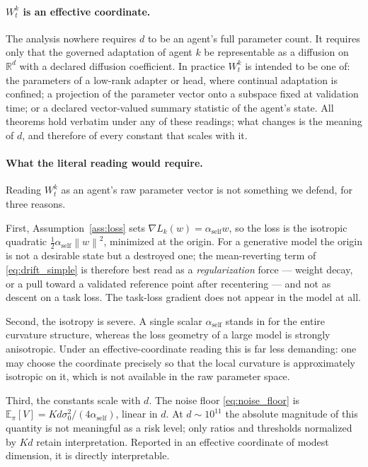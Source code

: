 \documentclass[12pt]{article}
\theoremstyle{plain}
\theoremstyle{definition}
\newcommand{\R}{\mathbb{R}}
\newcommand{\E}{\mathbb{E}}
\newcommand{\norm}[1]{\left\lVert #1 \right\rVert}
\newcommand{\loss}{L}
\begin{document}
\paragraph{$W^k_t$ is an effective coordinate.}
The analysis nowhere requires $d$ to be an agent's full parameter count. It requires only that the
governed adaptation of agent $k$ be representable as a diffusion on $\R^d$ with a declared
diffusion coefficient. In practice $W^k_t$ is intended to be one of: the parameters of a low-rank
adapter or head, where continual adaptation is confined; a projection of the parameter vector onto
a subspace fixed at validation time; or a declared vector-valued summary statistic of the agent's
state. All theorems hold verbatim under any of these readings; what changes is the meaning of $d$,
and therefore of every constant that scales with it.

\paragraph{What the literal reading would require.}
Reading $W^k_t$ as an agent's raw parameter vector is not something we defend, for three reasons.

First, Assumption~\ref{ass:loss} sets $\nabla\loss_k(w)=\alpha_{\mathrm{self}}w$, so the loss is
the isotropic quadratic $\tfrac12\alpha_{\mathrm{self}}\norm{w}^2$, minimized at the origin. For a
generative model the origin is not a desirable state but a destroyed one; the mean-reverting term
of \eqref{eq:drift_simple} is therefore best read as a \emph{regularization} force --- weight decay,
or a pull toward a validated reference point after recentering --- and not as descent on a task
loss. The task-loss gradient does not appear in the model at all.

Second, the isotropy is severe. A single scalar $\alpha_{\mathrm{self}}$ stands in for the entire
curvature structure, whereas the loss geometry of a large model is strongly anisotropic. Under an
effective-coordinate reading this is far less demanding: one may choose the coordinate precisely so
that the local curvature is approximately isotropic on it, which is not available in the raw
parameter space.

Third, the constants scale with $d$. The noise floor \eqref{eq:noise_floor} is
$\E_\pi[V]=Kd\sigma_0^2/(4\alpha_{\mathrm{self}})$, linear in $d$. At $d\sim10^{11}$ the absolute
magnitude of this quantity is not meaningful as a risk level; only ratios and thresholds normalized
by $Kd$ retain interpretation. Reported in an effective coordinate of modest dimension, it is
directly interpretable.
\end{document}
